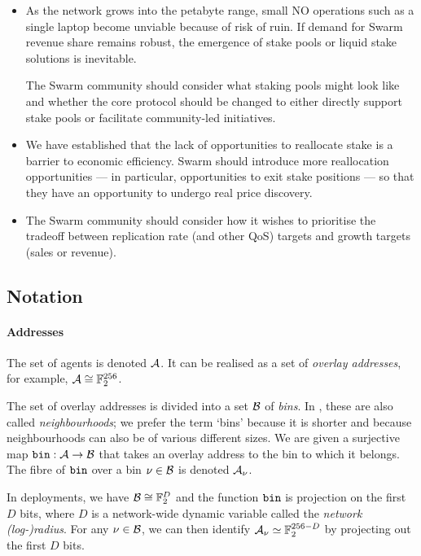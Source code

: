 \begin{itemize}
  \item
    As the network grows into the petabyte range, small NO operations such as a single laptop become unviable because of risk of ruin.
    If demand for Swarm revenue share remains robust, the emergence of stake pools or liquid stake solutions is inevitable.

    The Swarm community should consider what staking pools might look like and whether the core protocol should be changed to either directly support stake pools or facilitate community-led initiatives.

  \item
    We have established that the lack of opportunities to reallocate stake is a barrier to economic efficiency.
    Swarm should introduce more reallocation opportunities --- in particular, opportunities to exit stake positions --- so that they have an opportunity to undergo real price discovery.

  \item
    The Swarm community should consider how it wishes to prioritise the tradeoff between replication rate (and other QoS) targets and growth targets (sales or revenue).

\end{itemize}

\subsection{Notation}

\paragraph{Addresses}

The set of agents is denoted $\mathcal{A}$.
%
It can be realised as a set of \emph{overlay addresses}, for example, $\mathcal{A} \cong \mathbb{F}_2^{256}$.

The set of overlay addresses is divided into a set $\mathcal{B}$ of \emph{bins}.
%
In \cite{book-of-swarm}, these are also called \emph{neighbourhoods}; we prefer the term `bins' because it is shorter and because neighbourhoods can also be of various different sizes.
%
We are given a surjective map $\mathtt{bin}:\mathcal{A}\rightarrow\mathcal{B}$ that takes an overlay address to the bin to which it belongs.
%
The fibre of $\mathtt{bin}$ over a bin $\nu\in\mathcal{B}$ is denoted $\mathcal{A}_\nu$.

In deployments, we have $\mathcal{B}\cong \mathbb{F}_2^D$ and the function $\mathtt{bin}$ is projection on the first $D$ bits, where $D$ is a network-wide dynamic variable called the \emph{network (log-)radius}.
%
For any $\nu\in\mathcal{B}$, we can then identify $\mathcal{A}_\nu\simeq\mathbb{F}_2^{256-D}$ by projecting out the first $D$ bits.


